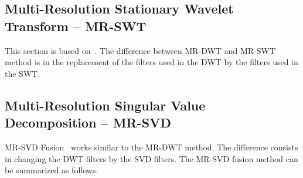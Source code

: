 \documentclass[journal]{IEEEtran}
\begin{document}
\subsection{Multi-Resolution Stationary Wavelet Transform -- MR-SWT}  
This section is based on~\cite{n_r, jjly}. The difference between MR-DWT and MR-SWT method is in the replacement of the filters used in the DWT by the filters used in the SWT.

\subsection{Multi-Resolution Singular Value Decomposition -- MR-SVD}

MR-SVD Fusion~\cite{naidu} works similar to the MR-DWT method. The difference consists in changing the DWT filters by the SVD filters. The MR-SVD fusion method can be summarized as follows:
\end{document}
